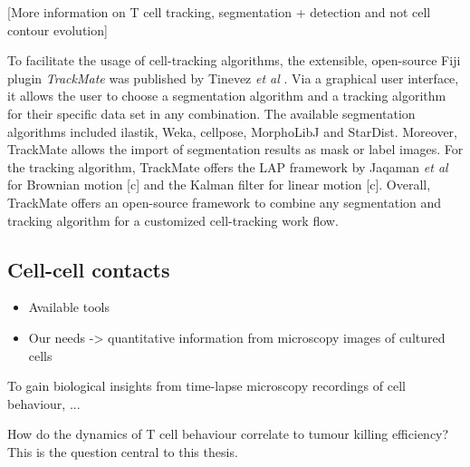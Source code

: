 \documentclass{report}
\begin{document}
[More information on T cell tracking, segmentation + detection and not cell contour evolution]

To facilitate the usage of cell-tracking algorithms, the extensible, open-source Fiji plugin \textit{TrackMate} was published by Tinevez \textit{et al} \citep{RN293}. Via a graphical user interface, it allows the user to choose a segmentation algorithm and a tracking algorithm for their specific data set in any combination. The available segmentation algorithms included ilastik, Weka, cellpose, MorphoLibJ and StarDist. Moreover, TrackMate allows the import of segmentation results as mask or label images. For the tracking algorithm, TrackMate offers the LAP framework by Jaqaman \textit{et al} for Brownian motion [c] and the Kalman filter for linear motion [c]. Overall, TrackMate offers an open-source framework to combine any segmentation and tracking algorithm for a customized cell-tracking work flow.


\subsection{Cell-cell contacts}

\begin{itemize}
	\item Available tools
	\item Our needs -> quantitative information from microscopy images of cultured cells
\end{itemize}

To gain biological insights from time-lapse microscopy recordings of cell behaviour, ...


How do the dynamics of T cell behaviour correlate to tumour killing efficiency? This is the question central to this thesis. 



\renewcommand{\bibname}{References}

\end{document}
